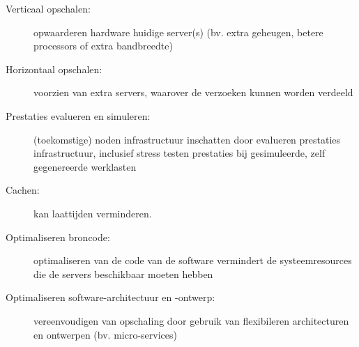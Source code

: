 \begin{description}
    \item [Verticaal opschalen:] opwaarderen hardware huidige server(s)
    (bv. extra geheugen, betere processors of extra bandbreedte)

    \item [Horizontaal opschalen:] voorzien van extra servers,
    waarover de verzoeken kunnen worden verdeeld

    \item [Prestaties evalueren en simuleren:] (toekomstige) noden infrastructuur
    inschatten door evalueren prestaties infrastructuur, inclusief
    stress testen prestaties bij gesimuleerde, zelf gegenereerde
    werklasten 

    \item [Cachen:] kan laattijden verminderen.

    \item [Optimaliseren broncode:] optimaliseren van de code van de software
    vermindert de systeemresources die de servers beschikbaar moeten hebben

    \item [Optimaliseren software-architectuur en -ontwerp:] vereenvoudigen van
    opschaling door gebruik van flexibileren architecturen en ontwerpen 
    (bv. micro-services)
\end{description}

